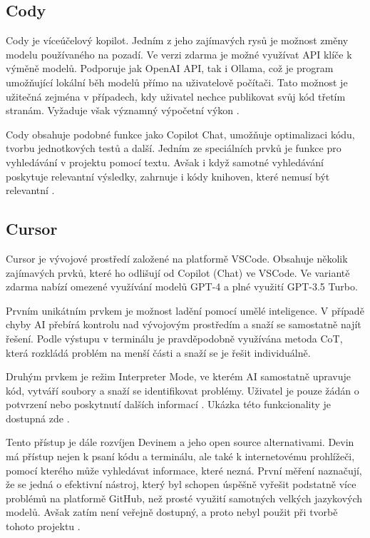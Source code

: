 \documentclass[FM,DP]{tulthesis}
\begin{document}
		\subsection{Cody}
		Cody je víceúčelový kopilot. Jedním z jeho zajímavých rysů je možnost změny modelu používaného na pozadí. Ve verzi zdarma je možné využívat API klíče k výměně modelů. Podporuje jak OpenAI API, tak i Ollama, což je program umožňující lokální běh modelů přímo na uživatelově počítači. Tato možnost je užitečná zejména v případech, kdy uživatel nechce publikovat svůj kód třetím stranám. Vyžaduje však významný výpočetní výkon \cite{ollama}.
		
		Cody obsahuje podobné funkce jako Copilot Chat, umožňuje optimalizaci kódu, tvorbu jednotkových testů a další. Jedním ze speciálních prvků je funkce pro vyhledávání v projektu pomocí textu. Avšak i když samotné vyhledávání poskytuje relevantní výsledky, zahrnuje i kódy knihoven, které nemusí být relevantní \cite{cody}.
		
		\subsection{Cursor}
		Cursor je vývojové prostředí založené na platformě VSCode. Obsahuje několik zajímavých prvků, které ho odlišují od Copilot (Chat) ve VSCode. Ve variantě zdarma nabízí omezené využívání modelů GPT-4 a plné využití GPT-3.5 Turbo.
		
		Prvním unikátním prvkem je možnost ladění pomocí umělé inteligence. V případě chyby AI přebírá kontrolu nad vývojovým prostředím a snaží se samostatně najít řešení. Podle výstupu v terminálu je pravděpodobně využívána metoda CoT, která rozkládá problém na menší části a snaží se je řešit individuálně.
		
		Druhým prvkem je režim Interpreter Mode, ve kterém AI samostatně upravuje kód, vytváří soubory a snaží se identifikovat problémy. Uživatel je pouze žádán o potvrzení nebo poskytnutí dalších informací \cite{cursor}. Ukázka této funkcionality je dostupná zde \cite{cursor_showcase}.
		
		Tento přístup je dále rozvíjen Devinem a jeho open source alternativami. Devin má přístup nejen k psaní kódu a terminálu, ale také k internetovému prohlížeči, pomocí kterého může vyhledávat informace, které nezná. První měření naznačují, že se jedná o efektivní nástroj, který byl schopen úspěšně vyřešit podstatně více problémů na platformě GitHub, než prosté využití samotných velkých jazykových modelů. Avšak zatím není veřejně dostupný, a proto nebyl použit při tvorbě tohoto projektu \cite{devin}.
		
\end{document}
